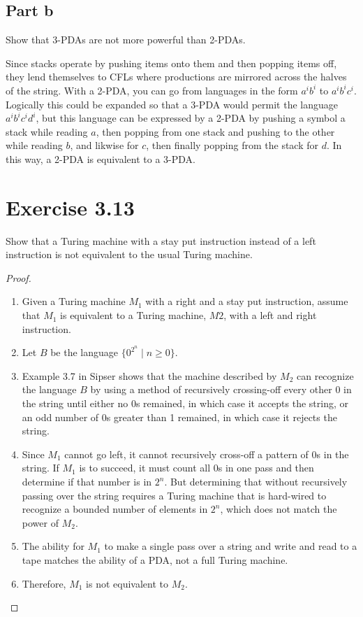 \documentclass{article}
\newcommand{\where}{\mid}
\begin{document}
\subsection{Part b}

Show that 3-PDAs are not more powerful than 2-PDAs.

Since stacks operate by pushing items onto them and then popping items off, they
lend themselves to CFLs where productions are mirrored across the halves of the
string. With a 2-PDA, you can go from languages in the form $a^ib^i$ to
$a^ib^ic^i$. Logically this could be expanded so that a 3-PDA would permit the
language $a^ib^ic^id^i$, but this language can be expressed by a 2-PDA by
pushing a symbol a stack while reading $a$, then popping from one stack and
pushing to the other while reading $b$, and likwise for $c$, then finally
popping from the stack for $d$. In this way, a 2-PDA is equivalent to a 3-PDA.

\section{Exercise 3.13}

Show that a Turing machine with a stay put instruction instead of a left
instruction is not equivalent to the usual Turing machine.

\begin{proof}
	\mbox{}
	\begin{enumerate}
	  \item Given a Turing machine $M_1$ with a right and a stay put instruction,
	  assume that $M_1$ is equivalent to a Turing machine, $M2$, with a left and
	  right instruction.
	  \item Let $B$ be the language $\{ 0^{2^n} \where n \geq 0 \}$.
	  \item Example 3.7 in Sipser shows that the machine described by $M_2$ can
	  recognize the language $B$ by using a method of recursively crossing-off
	  every other 0 in the string until either no 0s remained, in which case it
	  accepts the string, or an odd number of 0s greater than 1 remained, in which
	  case it rejects the string.
	  \item Since $M_1$ cannot go left, it cannot recursively cross-off a pattern
	  of 0s in the string. If $M_1$ is to succeed, it must count all 0s in one pass
	  and then determine if that number is in $2^n$. But determining that
	  without recursively passing over the string requires a Turing machine that 
	  is hard-wired to recognize a bounded number of elements in $2^n$, which does
	  not match the power of $M_2$.
	  \item The ability for $M_1$ to make a single pass over a string and write and
	  read to a tape matches the ability of a PDA, not a full Turing machine.
	  \item Therefore, $M_1$ is not equivalent to $M_2$. \qedhere
	\end{enumerate}
\end{proof}
\end{document}
